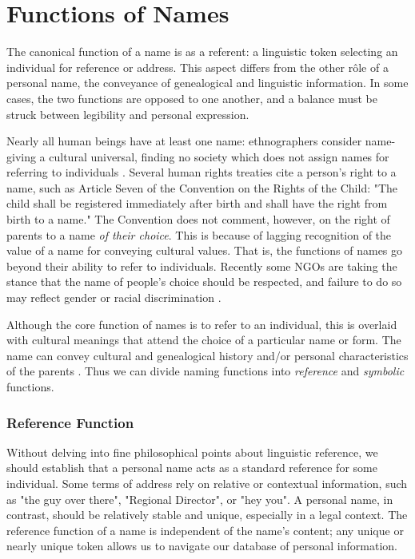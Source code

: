 \section{Functions of Names}

The canonical function of a name is as a referent: a linguistic token selecting
an individual for reference or address. This aspect differs from the other rôle
of a personal name, the conveyance of genealogical and linguistic information.
In some cases, the two functions are opposed to one another, and a balance must
be struck between legibility and personal expression.

Nearly all human beings have at least one name: ethnographers consider
name-giving a cultural universal, finding no society which does not
assign names for referring to individuals \parencite{alford87}. Several human
rights treaties cite a person's right to a name, such as Article Seven of
the Convention on the Rights of the Child: "The child shall be registered
immediately after birth and shall have the right from birth to a name."
\parencite{crc} The Convention does not comment, however, on the right of
parents to a name \textit{of their choice}. This is because of lagging
recognition of the value of a name for conveying cultural values. That is, the
functions of names go beyond their ability to refer to individuals. Recently
some NGOs are taking the stance that the name of people's choice should be
respected, and failure to do so may reflect gender or racial discrimination
\parencite[986]{varennes15}.

Although the core function of names is to refer to an individual, this is
overlaid with cultural meanings that attend the choice of a particular name or
form. The name can convey cultural and genealogical history and/or personal
characteristics of the parents \parencite{finch08}. Thus we can divide naming
functions into \textit{reference} and \textit{symbolic} functions.

\subsubsection{Reference Function}

Without delving into fine philosophical points about linguistic reference, we
should establish that a personal name acts as a standard reference for some
individual. Some terms of address rely on relative or contextual
information, such as "the guy over there", "Regional Director", or "hey you". A
personal name, in contrast, should be relatively stable and unique, especially
in a legal context. The reference function of a name is independent of the name's content; any
unique or nearly unique token allows us to navigate our database of personal
information.


